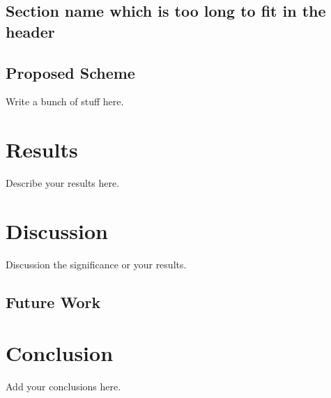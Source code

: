 \documentclass[PhD]{PHlab-thesis}
\begin{document}
\section[shorter sec. name]{Section name which is too long to fit in the header}


\section{Proposed Scheme}
Write a bunch of stuff here.

	
\chapter{Results}
Describe your results here.


\chapter{Discussion}
Discussion the significance or your results.


\section{Future Work}


\chapter{Conclusion}
Add your conclusions here.


\newpage
{}
\printbibliography
\end{document}

